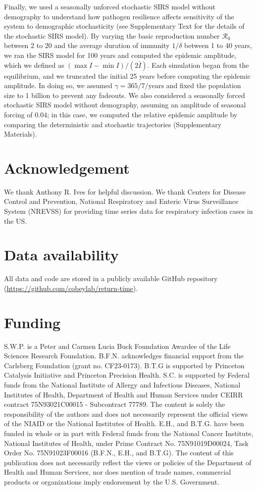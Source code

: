 \documentclass[12pt]{article}
\begin{document}
Finally, we used a seasonally unforced stochastic SIRS model without demography to understand how pathogen resilience affects sensitivity of the system to demographic stochasticity (see Supplementary Text for the details of the stochastic SIRS model).
By varying the basic reproduction number $\mathcal R_0$ between 2 to 20 and the average duration of immunity $1/\delta$ between 1 to 40 years, we ran the SIRS model for 100 years and computed the epidemic amplitude, which we defined as  $(\max I - \min I)/(2 \bar{I})$.
Each simulation began from the equilibrium, and we truncated the initial 25 years before computing the epidemic amplitude.
In doing so, we assumed $\gamma=365/7/\mathrm{years}$ and fixed the population size to 1 billion to prevent any fadeouts.
We also considered a seasonally forced stochastic SIRS model without demography, assuming an amplitude of seasonal forcing of $0.04$;
in this case, we computed the relative epidemic amplitude by comparing the deterministic and stochastic trajectories (Supplementary Materials).

\section*{Acknowledgement}

We thank Anthony R. Ives for helpful discussion.
We thank Centers for Disease Control and Prevention, National Respiratory and Enteric Virus Surveillance System (NREVSS) for providing time series data for respiratory infection cases in the US.

\section*{Data availability}

All data and code are stored in a publicly available GitHub repository (\url{https://github.com/cobeylab/return-time}).

\section*{Funding}

S.W.P. is a Peter and Carmen Lucia Buck Foundation Awardee of the Life Sciences Research Foundation. 
B.F.N. acknowledges financial support from the Carlsberg Foundation (grant no. CF23-0173).
B.T.G is supported by Princeton Catalysis Initiative and Princeton Precision Health.
S.C. is supported by Federal funds from the National Institute of Allergy and Infectious Diseases, National Institutes of Health, Department of Health and Human Services under CEIRR contract 75N93021C00015 - Subcontract 77789.
The content is solely the responsibility of the authors and does not necessarily represent the official views of the NIAID or the National Institutes of Health. 
E.H., and B.T.G. have been funded in whole or in part with Federal funds from the National Cancer Institute, National Institutes of Health, under Prime Contract No. 75N91019D00024, Task Order No. 75N91023F00016 (B.F.N., E.H., and B.T.G). 
The content of this publication does not necessarily reflect the views or policies of the Department of Health and Human Services, nor does mention of trade names, commercial products or organizations imply endorsement by the U.S. Government.

\pagebreak


\end{document}
